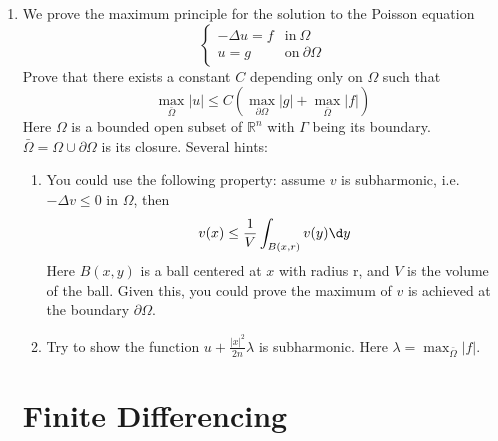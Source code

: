 \documentclass{article}
\newcommand\NoIndent[1]{%
  \begingroup
  \par
  \parshape0
  #1\par
  \endgroup
}
\begin{document}
\begin{enumerate}
	\item We prove the maximum principle for the solution to the Poisson equation
		\begin{equation*}
			\begin{cases}
				-\Delta u = f & \mathrm{in\ } \Omega \\
				u = g & \mathrm{on\ } \partial\Omega
			\end{cases}
		\end{equation*}
		Prove that there exists a constant $C$ depending only on $\Omega$ such that
		\begin{equation*}
			\max_{\bar{\Omega}}|u| \leq C\left(\max_{\partial\Omega}|g| + \max_{\bar{\Omega}}|f|\right)
		\end{equation*}
		Here $\Omega$ is a bounded open subset of $\mathbb{R}^n$ with $\Gamma$ being its boundary.
		$\bar{\Omega} = \Omega \cup \partial\Omega$ is its closure.
		Several hints:
		\begin{enumerate}
			\item You could use the following property:
				assume $v$ is subharmonic, i.e.\ $-\Delta v \leq 0$ in $\Omega$, then
				\begin{equation*}
					v(x) \leq \frac{1}{V}\int_{B(x,r)}v(y)\d y
				\end{equation*}
				Here $B(x,y)$ is a ball centered at $x$ with radius r, and $V$ is the volume of the ball.
				Given this, you could prove the maximum of $v$ is achieved at the boundary $\partial\Omega$.
			\item Try to show the function $u + \displaystyle\frac{|x|^2}{2n}\lambda$ is subharmonic.
			Here $\lambda = \displaystyle\max_{\bar{\Omega}}|f|$.
		\end{enumerate}

\NoIndent{
	
}

\NoIndent{\section{Finite Differencing}}


\end{enumerate}
\end{document}
